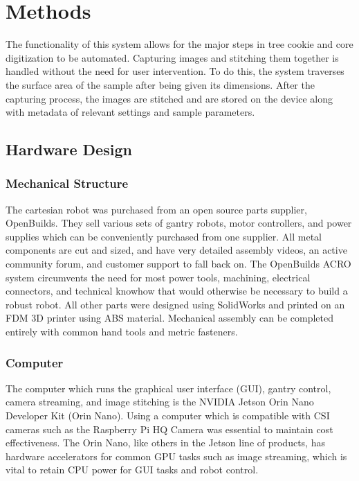 \documentclass[a4paper,12pt]{article}
\begin{document}
\section{Methods}
The functionality of this system allows for the major steps in tree cookie and core digitization to be automated. Capturing images and stitching them together is handled without the need for user intervention. 
To do this, the system traverses the surface area of the sample after being given its dimensions. After the capturing process, the images are stitched and are stored on the device along with metadata of relevant 
settings and sample parameters.

\subsection{Hardware Design}

\subsubsection{Mechanical Structure}
The cartesian robot was purchased from an open source parts supplier, OpenBuilds. They sell various sets of gantry robots, motor controllers, and power supplies
which can be conveniently purchased from one supplier. All metal components are cut and sized, and have very detailed assembly videos, an active community forum,
and customer support to fall back on. The OpenBuilds ACRO system circumvents the need for most power tools, machining, electrical connectors, and technical knowhow that would otherwise be necessary to build a robust robot.
All other parts were designed using SolidWorks and printed on an FDM 3D printer using ABS material. Mechanical assembly can be completed entirely with common hand tools and metric fasteners. 

\subsubsection{Computer}
The computer which runs the graphical user interface (GUI), gantry control, camera streaming, and image stitching is the NVIDIA Jetson Orin Nano Developer Kit (Orin Nano). Using a computer
which is compatible with CSI cameras such as the Raspberry Pi HQ Camera was essential to maintain cost effectiveness. The Orin Nano, like others in the Jetson line of products, has hardware
accelerators for common GPU tasks such as image streaming, which is vital to retain CPU power for GUI tasks and robot control. 
\end{document}
